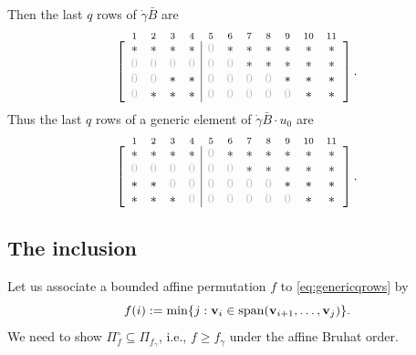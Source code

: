 \documentclass[12pt,reqno]{amsart}
\numberwithin{equation}{section}
\theoremstyle{definition}
\begin{document}
Then the last $q$ rows of $\dot{\gamma}\bar{B}$ are
$$
\def\O{{\color{lightgray}0}}
\def\I{1}\def\X{*}
\def\ind#1#2{\raisebox{0pc}[0pc][0pc]{%
    $\stackrel{#1}{\vphantom{\frac12}#2}$\vphantom{#2}}}
\begin{matrix}\\[-1ex]
\left[\begin{array}{cccc|ccccccc}
\ind{1}{\X}&\ind{2}\X&\ind{3}{\X}&\ind{4}{\X}&\ind{5}{\O}&\ind{6}{\X}&\ind{7}{\X}&\ind{8}{\X}&\ind{9}{\X}&\ind{10}{\X}&\ind{11}{\X}\\
\O&\O&\O&\O&\O&\O&\X&\X&\X&\X&\X\\
\O&\O&\X&\X&\O&\O&\O&\O&\X&\X&\X\\
\O&\X&\X&\X&\O&\O&\O&\O&\O&\X&\X\\
\end{array}\right].
\end{matrix}$$
Thus the last $q$ rows of a generic element of $\dot{\gamma}\bar{B}\cdot u_0$ are 
\begin{equation}\label{eq:runningPosEg}
\def\O{{\color{lightgray}0}}
\def\I{1}\def\X{*}
\def\ind#1#2{\raisebox{0pc}[0pc][0pc]{%
    $\stackrel{#1}{\vphantom{\frac12}#2}$\vphantom{#2}}}
\begin{matrix}\\[-1ex]
\left[\begin{array}{cccc|ccccccc}
\ind{1}{\X}&\ind{2}\X&\ind{3}{\X}&\ind{4}{\X}&\ind{5}{\O}&\ind{6}{\X}&\ind{7}{\X}&\ind{8}{\X}&\ind{9}{\X}&\ind{10}{\X}&\ind{11}{\X}\\
\O&\O&\O&\O&\O&\O&\X&\X&\X&\X&\X\\
\X&\X&\O&\O&\O&\O&\O&\O&\X&\X&\X\\
\X&\X&\X&\O&\O&\O&\O&\O&\O&\X&\X\\
\end{array}\right].
\end{matrix}
\end{equation}

\subsection{The inclusion}

Let us associate a bounded affine permutation $f$  to \eqref{eq:genericqrows} by 
$$f(i):=\min\{j:\mathbf{v}_i\in \operatorname{span}(\mathbf{v}_{i+1},\ldots,\mathbf{v}_j)\}.$$
We need to show $\Pi_f^\circ\subseteq \Pi_{f_\gamma}$, i.e., $f\geq f_\gamma$ under the affine Bruhat order. 
\end{document}
